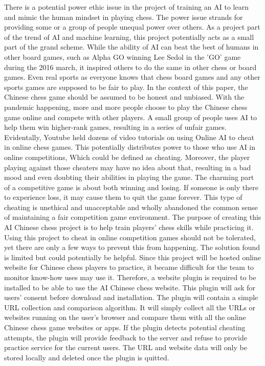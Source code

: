 \documentclass[10pt,twocolumn]{article}
\begin{document}
	There is a potential power ethic issue in the project of training an AI to learn and mimic the human mindset in playing chess. The power issue strands for providing some or a group of people unequal power over others. As a project part of the trend of AI and machine learning, this project potentially acts as a small part of the grand scheme. While the ability of AI can beat the best of humans in other board games, such as Alpha GO winning Lee Sedol in the 'GO' game during the 2016 march, it inspired others to do the same in other chess or board games\cite{AlphaGo}. Even real sports as everyone knows that chess board games and any other sports games are supposed to be fair to play. In the context of this paper, the Chinese chess game should be assumed to be honest and unbiased. With the pandemic happening, more and more people choose to play the Chinese chess game online and compete with other players. A small group of people uses AI to help them win higher-rank games, resulting in a series of unfair games. Evidentally, Youtube held dozens of video tutorials on using Online AI to cheat in online chess games. This potentially distributes power to those who use AI in online competitions, Which could be defined as cheating. Moreover, the player playing against those cheaters may have no idea about that, resulting in a bad mood and even doubting their abilities in playing the game. The charming part of a competitive game is about both winning and losing. If someone is only there to experience loss, it may cause them to quit the game forever. This type of cheating is unethical and unacceptable and wholly abandoned the common sense of maintaining a fair competition game environment. The purpose of creating this AI Chinese chess project is to help train players' chess skills while practicing it. Using this project to cheat in online competition games should not be tolerated, yet there are only a few ways to prevent this from happening. The solution found is limited but could potentially be helpful. Since this project will be hosted online website for Chinese chess players to practice, it became difficult for the team to monitor know-how uses may use it. Therefore, a website plugin is required to be installed to be able to use the AI Chinese chess website. This plugin will ask for users' consent before download and installation. The plugin will contain a simple URL collection and comparison algorithm. It will simply collect all the URLs or websites running on the user's browser and compare them with all the online Chinese chess game websites or apps. If the plugin detects potential cheating attempts, the plugin will provide feedback to the server and refuse to provide practice service for the current users. The URL and website data will only be stored locally and deleted once the plugin is quitted. 
\end{document}
